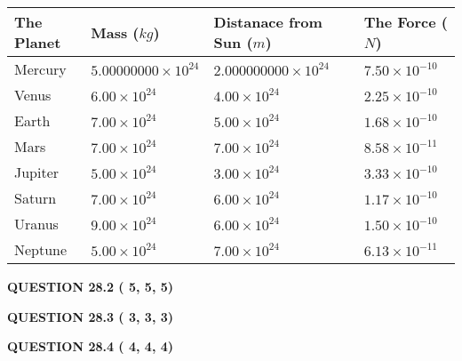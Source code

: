 \documentclass[12pt]{article}
\begin{document}
 
\begin{tabular}{|l|l|l|l|}
\hline
The Planet & Mass ($kg$) & Distanace from Sun ($m$) & The Force ($N$)\\
\hline
Mercury  &
           $ %
5.00000000 \times 10^{24} $   &
             $ %
2.000000000 \times 10^{24} $    & $ %
7.50 \times 10^{-10} $
\\  \hline
Venus    &
           $  %
6.00 \times 10^{24}  $     &
             $ %
4.00 \times 10^{24} $    & $ %
2.25 \times 10^{-10} $
\\  \hline
Earth    &
           $  %
7.00 \times 10^{24}  $     &
             $ %
5.00 \times 10^{24} $    & $ %
1.68 \times 10^{-10} $
\\   \hline
Mars     &
           $  %
7.00 \times 10^{24} $     &
             $ %
7.00 \times 10^{24} $    & $ %
8.58 \times 10^{-11} $
\\   \hline
Jupiter  &
           $  %
5.00 \times 10^{24} $    &
             $ %
3.00 \times 10^{24} $    & $ %
3.33 \times 10^{-10} $
\\  \hline
Saturn   &
           $  %
7.00 \times 10^{24} $    &
             $ %
6.00 \times 10^{24}  $    & $ %
1.17 \times 10^{-10} $
\\  \hline
Uranus   &
           $  %
9.00 \times 10^{24} $    &
             $ %
6.00 \times 10^{24} $    & $ %
1.50 \times 10^{-10} $
\\  \hline
Neptune  &
           $  %
5.00 \times 10^{24} $    &
             $ %
7.00 \times 10^{24} $    & $ %
6.13 \times 10^{-11} $
\\  \hline
 
\end{tabular}
 
 
 
 
  
\vspace{0.2in}
  
{\textbf{\Large{QUESTION
28.2 
 (          5,          5,          5)
}}}
  
  
  
\vspace{0.2in}
  
{\textbf{\Large{QUESTION
28.3 
 (          3,          3,          3)
}}}
  
  
  
\vspace{0.2in}
  
{\textbf{\Large{QUESTION
28.4 
 (          4,          4,          4)
}}}
  
\end{document}

